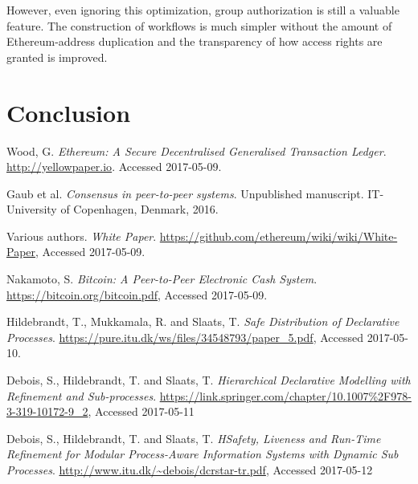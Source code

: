 \documentclass{article}
\begin{document}
		However, even ignoring this optimization, group authorization is still a valuable feature.
		The construction of workflows is much simpler without the amount of Ethereum-address duplication and the transparency of how access rights are granted is improved.
		
	\section{Conclusion}

	\pagebreak
	
	\begin{thebibliography}{99}

		Wood, G.
		\textit{Ethereum: A Secure Decentralised Generalised Transaction Ledger}. 
		\url{http://yellowpaper.io}.
		Accessed 2017-05-09.

		Gaub et al.
		\textit{Consensus in peer-to-peer systems}.
		Unpublished manuscript.
		IT-University of Copenhagen,
		Denmark,
		2016.

		Various authors.
		\textit{White Paper}.
		\url{https://github.com/ethereum/wiki/wiki/White-Paper},
		Accessed 2017-05-09.

		Nakamoto, S.
		\textit{Bitcoin: A Peer-to-Peer Electronic Cash System}.
		\url{https://bitcoin.org/bitcoin.pdf},
		Accessed 2017-05-09.

		Hildebrandt, T., Mukkamala, R. and Slaats, T.
		\textit{Safe Distribution of Declarative Processes}.
		\url{https://pure.itu.dk/ws/files/34548793/paper_5.pdf},
		Accessed 2017-05-10.

		Debois, S., Hildebrandt, T. and Slaats, T.
		\textit{Hierarchical Declarative Modelling with Refinement and Sub-processes}.
		\url{https://link.springer.com/chapter/10.1007%2F978-3-319-10172-9_2},
		Accessed 2017-05-11

		Debois, S., Hildebrandt, T. and Slaats, T.
		\textit{HSafety, Liveness and Run-Time Refinement for Modular Process-Aware Information Systems with Dynamic Sub Processes}.
		\url{http://www.itu.dk/~debois/dcrstar-tr.pdf},
		Accessed 2017-05-12
		

	\end{thebibliography}

	\clearpage

\end{document}
